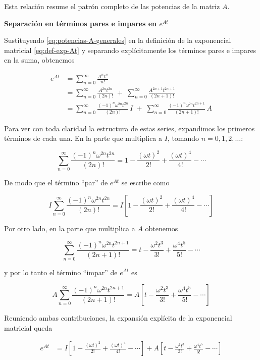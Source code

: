 \documentclass{article}
\begin{document}
Esta relación resume el patrón completo de las potencias de la matriz $A$.

\bigskip
\textcolor{trueblue}{\textbf{Separación en términos pares e impares en $e^{At}$}}

Sustituyendo \eqref{eq:potencias-A-generales} en la definición de la exponencial
matricial \eqref{eq:def-exp-At} y separando explícitamente los términos pares e
impares en la suma, obtenemos

\begin{equation}
\begin{split}
e^{At}
&= \sum_{n=0}^{\infty} \frac{A^{n} t^{n}}{n!} \\[4pt]
&= \sum_{n=0}^{\infty} \frac{A^{2n} t^{2n}}{(2n)!}
   \;+\; \sum_{n=0}^{\infty} \frac{A^{2n+1} t^{2n+1}}{(2n+1)!} \\[4pt]
&= \sum_{n=0}^{\infty}
   \frac{(-1)^{n}\omega^{2n} t^{2n}}{(2n)!}\,I
   \;+\;
   \sum_{n=0}^{\infty}
   \frac{(-1)^{n}\omega^{2n} t^{2n+1}}{(2n+1)!}\,A
\end{split}
\label{eq:exp-At-series}
\end{equation}

Para ver con toda claridad la estructura de estas series, expandimos los primeros
términos de cada una. En la parte que multiplica a $I$, tomando $n=0,1,2,\dots$:

\[
\sum_{n=0}^{\infty}
\frac{(-1)^{n}\omega^{2n} t^{2n}}{(2n)!}
=
1
- \frac{(\omega t)^{2}}{2!}
+ \frac{(\omega t)^{4}}{4!}
- \cdots
\]

De modo que el término “par” de $e^{At}$ se escribe como

\[
I\sum_{n=0}^{\infty}
\frac{(-1)^{n}\omega^{2n} t^{2n}}{(2n)!}
=
I\left[1 - \frac{(\omega t)^{2}}{2!}
          + \frac{(\omega t)^{4}}{4!}
          - \cdots \right]
\]

Por otro lado, en la parte que multiplica a $A$ obtenemos

\[
\sum_{n=0}^{\infty}
\frac{(-1)^{n}\omega^{2n} t^{2n+1}}{(2n+1)!}
=
t
- \frac{\omega^{2} t^{3}}{3!}
+ \frac{\omega^{4} t^{5}}{5!}
- \cdots
\]

y por lo tanto el término “impar” de $e^{At}$ es

\[
A\sum_{n=0}^{\infty}
\frac{(-1)^{n}\omega^{2n} t^{2n+1}}{(2n+1)!}
=
A\left[
t
- \frac{\omega^{2} t^{3}}{3!}
+ \frac{\omega^{4} t^{5}}{5!}
- \cdots
\right]
\]

Reuniendo ambas contribuciones, la expansión explícita de la exponencial matricial
queda

\begin{equation}
\begin{split}
e^{At}
&=
I\left[
1 - \frac{(\omega t)^{2}}{2!}
  + \frac{(\omega t)^{4}}{4!}
  - \cdots
\right]
+
A\left[
t
- \frac{\omega^{2} t^{3}}{3!}
+ \frac{\omega^{4} t^{5}}{5!}
- \cdots
\right]
\end{split}
\label{eq:exp-At-expandida-1}
\end{equation}
\end{document}
